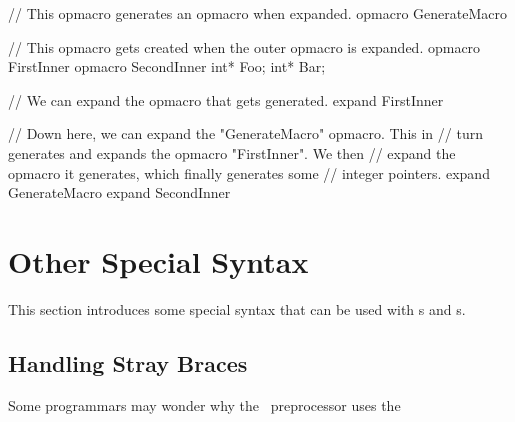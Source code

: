 {\begin{opcpp}[label={fig:opmacro:genopmacros},caption={Using an \opcppk{opmacro} to generate other \opcppk{opmacro}s.}]
// This opmacro generates an opmacro when expanded.
opmacro GenerateMacro
{
    // This opmacro gets created when the outer opmacro is expanded.
    opmacro FirstInner
    {
        opmacro SecondInner
        {
            int* Foo;
            int* Bar;
        }
    }

    // We can expand the opmacro that gets generated.
    expand FirstInner
}

// Down here, we can expand the "GenerateMacro" opmacro.  This in
// turn generates and expands the opmacro "FirstInner".  We then 
// expand the opmacro it generates, which finally generates some 
// integer pointers.
expand GenerateMacro
expand SecondInner
\end{opcpp}

\section{Other Special Syntax}
\label{sec:other_special_syntax}

This section introduces some special syntax that can be used with s and s.  

\subsection{Handling Stray Braces}
\label{subsec:stray_braces}

Some programmars may wonder why the \cpp\ preprocessor uses the }
